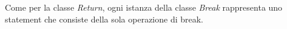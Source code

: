 
Come per la classe \textit{Return}, ogni istanza della classe \textit{Break} rappresenta uno statement che consiste della sola operazione di break.